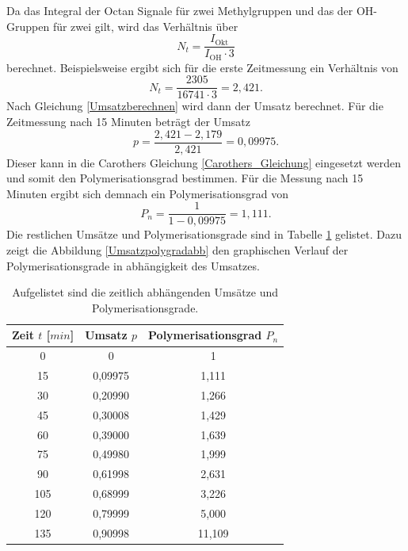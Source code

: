 \documentclass[10pt,a4paper,ngerman]{scrartcl}
\begin{document}
		Da das Integral der Octan Signale für zwei Methylgruppen und das der OH-Gruppen für zwei gilt, wird das Verhältnis über 
		\begin{equation}
			N_t = \frac{I_\text{Okt}}{I_\text{OH} \cdot 3}
		\end{equation}
		berechnet. Beispielsweise ergibt sich für die erste Zeitmessung ein Verhältnis von
		\begin{equation*}
			N_t = \frac{2305}{16741 \cdot 3} = 2,421 \text{.}
		\end{equation*}
		Nach Gleichung \ref{Umsatzberechnen} wird dann der Umsatz berechnet. Für die Zeitmessung nach 15 Minuten beträgt der Umsatz
		\begin{equation*}
			p = \frac{2,421 - 2,179}{2,421} = 0,09975 \text{.}
		\end{equation*}
		Dieser kann in die Carothers Gleichung \ref{Carothers_Gleichung} eingesetzt werden und somit den Polymerisationsgrad bestimmen. 
		Für die Messung nach 15 Minuten ergibt sich demnach ein Polymerisationsgrad von
		\begin{equation*}
			P_n = \frac{1}{1-0,09975} = 1,111 \text{.}
		\end{equation*}
		\newpage
		Die restlichen Umsätze und Polymerisationsgrade sind in Tabelle \ref{Umsatzpolygradtab} gelistet. Dazu zeigt die Abbildung \ref{Umsatzpolygradabb} den graphischen 
		Verlauf der Polymerisationsgrade in abhängigkeit des Umsatzes.

		\begin{table}[H]
    	\begin{center}
        	\caption{Aufgelistet sind die zeitlich abhängenden Umsätze und Polymerisationsgrade.}
        	\label{Umsatzpolygradtab}
            	\begin{tabular}{c|c|c}
					\hline
					Zeit $t$ [$min$]& Umsatz $p$ & Polymerisationsgrad $P_n$ \\
					\hline 
					0	&	0	&1 \\
					15	&	0,09975	&1,111 \\
					30	&	0,20990	&1,266\\
					45	&	0,30008	&1,429\\
					60	&	0,39000	&1,639\\
					75	&	0,49980	&1,999\\
					90	&	0,61998	&2,631\\
					105	&	0,68999	&3,226\\
					120	&	0,79999	&5,000\\
					135	&	0,90998	&11,109\\
				\end{tabular}
		\end{center}
		\end{table}
\end{document}
